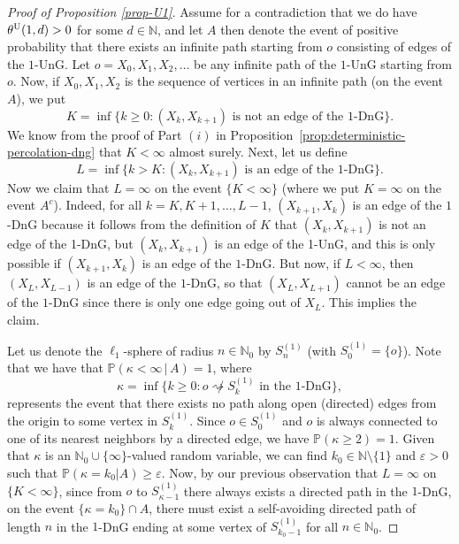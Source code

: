 \documentclass[a4paper, oneside, 11pt]{amsart}
\newcommand{\N}{\mathbb{N}}
\theoremstyle{definition}
\renewcommand{\P}{\mathbb{P}}
\newcommand{\1}{\mathbbm{1}}
\newcommand{\0}{\mathbf{o}}
\numberwithin{equation}{section}
\begin{document}
\begin{proof}[Proof of Proposition \ref{prop-U1}]
    Assume for a contradiction that we do have $\theta^{\rm U}(1,d)>0$ for some $d \in \N$, and let $A$ then denote the event of positive probability that there exists an infinite path starting from $o$ consisting of edges of the $1$-UnG. %
Let $o=X_0,X_1,X_2,\ldots$ be any infinite path of the $1$-UnG starting from $o$.
Now, if $X_0,X_1,X_2$ is the sequence of vertices in an infinite path (on the event $A$), we put
\[ K=\inf \{ k \geq 0 \colon (X_k,X_{k+1}) \text{ is not an edge of the $1$-DnG} \}. \]
We know from the proof of Part $(i)$ in Proposition~\ref{prop:deterministic-percolation-dng} that $K<\infty$ almost surely. Next, let us define
\[ L=\inf \{ k > K \colon 
(X_{k},X_{k+1})\text{ is an edge of the 1-DnG}\}. \]
Now we claim that $L=\infty$ on the event $\{ K<\infty\}$ (where we put $K=\infty$ on the event $A^c$). Indeed, for all $k=K,K+1,\ldots,L-1$, $(X_{k+1},X_k)$ is an edge of the $1$-DnG because it follows from the definition of $K$ that $(X_{k},X_{k+1})$ is not an edge of the 1-DnG, but $(X_k,X_{k+1})$ is an edge of the 1-UnG, and this is only possible if $(X_{k+1},X_k)$ is an edge of the $1$-DnG. But now, if $L<\infty$, then $(X_{L},X_{L-1})$ is an edge of the $1$-DnG, so that $(X_{L},X_{L+1})$ cannot be an edge of the $1$-DnG since there is only one edge going out of $X_L$. This implies the claim.

Let us denote the $\ell_1$-sphere of radius $n\in\N_0$ by $S^{(1)}_n$ (with $S^{(1)}_0=\{o\}$). Note that we have that $\P(\kappa<\infty\,|\,A)=1$, where
\[ \kappa = \inf \big\{ k \geq 0 \colon o \not\rightsquigarrow S^{(1)}_k \text{ in the $1$-DnG} \big\}, \]
represents the event that there exists no path along open (directed) edges from the origin to some vertex in $S^{(1)}_k$. 
Since $o \in S_0^{(1)}$ and $o$ is always connected to one of its nearest neighbors by a directed edge, we have $\P(\kappa \geq 2)=1$.
Given that $\kappa$ is an $\N_0 \cup \{\infty\}$-valued random variable, we can find $k_0\in\N \setminus \{ 1 \}$ and $\varepsilon>0$ such that $\P(\kappa =  k_0 |A) \geq \varepsilon$.  Now, by our previous observation that $L=\infty$ on $\{ K<\infty\}$, since from $o$ to $S^{(1)}_{\kappa-1}$ there always exists a directed path in the $1$-DnG, 
on the event $\{ \kappa = k_0 \} \cap A$, there must exist a self-avoiding directed path of length $n$ in the $1$-DnG ending at some vertex of $S^{(1)}_{k_0-1}$  for all $n\in\N_0$. 


\end{proof}
\end{document}
